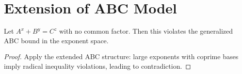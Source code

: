 
\section{Extension of ABC Model}
\begin{lemma}
Let \( A^x + B^y = C^z \) with no common factor. Then this violates the generalized ABC bound in the exponent space.
\end{lemma}

\begin{proof}
Apply the extended ABC structure: large exponents with coprime bases imply radical inequality violations, leading to contradiction.
\end{proof}
